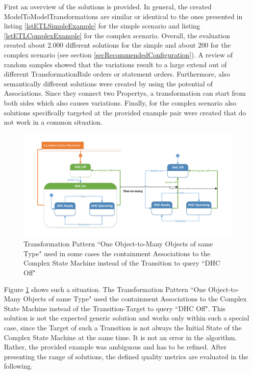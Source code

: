 First an overview of the solutions is provided. In general, the created \glspl{ModelToModelTransformation} are similar or identical to the ones presented in listing \ref{lstETLSimpleExample} for the simple scenario and listing \ref{lstETLComplexExample} for the complex scenario. Overall, the evaluation created about 2.000 different solutions for the simple and about 200 for the complex scenario (see section \ref{secRecommendedConfiguration}). A review of random samples showed that the variations result to a large extend out of different \gls{TransformationRule} orders or statement orders. Furthermore, also semantically different solutions were created by using the potential of \glspl{Association}. Since they connect two \glspl{Property}, a transformation can start from both sides which also causes variations. Finally, for the complex scenario also solutions specifically targeted at the provided example pair were created that do not work in a common situation. 

\begin{figure}[!ht]
	\centering
	\includegraphics[scale=0.6, trim=0cm 1cm 0cm 0cm, clip=true]{Images/UnexpectedShortcut.pdf} 
	\caption{Transformation Pattern ``One Object-to-Many Objects of same Type" used in some cases the containment \glspl{Association} to the Complex State Machine instead of the Transition to query ``DHC Off"}
	\label{figUnexpectedShortcut}
\end{figure}

Figure \ref{figUnexpectedShortcut} shows such a situation. The Transformation Pattern ``One Object-to-Many Objects of same Type" used the containment \glspl{Association} to the Complex State Machine instead of the Transition-Target to query ``DHC Off". This solution is not the expected generic solution and works only within such a special case, since the Target of such a Transition is not always the Initial State of the Complex State Machine at the same time. It is not an error in the algorithm. Rather, the provided example was ambiguous and has to be refined. After presenting the range of solutions, the defined quality metrics are evaluated in the following.

